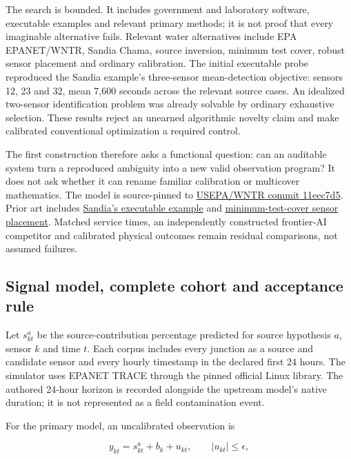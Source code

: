 \documentclass[
  11pt,
]{article}
\begin{document}
The search is bounded. It includes government and laboratory software,
executable examples and relevant primary methods; it is not proof that
every imaginable alternative fails. Relevant water alternatives include
EPA EPANET/WNTR, Sandia Chama, source inversion, minimum test cover,
robust sensor placement and ordinary calibration. The initial executable
probe reproduced the Sandia example's three-sensor mean-detection
objective: sensors 12, 23 and 32, mean 7,600 seconds across the relevant
source cases. An idealized two-sensor identification problem was already
solvable by ordinary exhaustive selection. These results reject an
unearned algorithmic novelty claim and make calibrated conventional
optimization a required control.

The first construction therefore asks a functional question: can an
auditable system turn a reproduced ambiguity into a new valid
observation program? It does not ask whether it can rename familiar
calibration or multicover mathematics. The model is source-pinned to
\href{https://github.com/USEPA/WNTR/tree/11eec7d5bf0a9367ffe04d75707918f0c0a890a1}{USEPA/WNTR
commit 11eec7d5}. Prior art includes
\href{https://github.com/sandialabs/chama/blob/main/examples/water_network_example.py}{Sandia's
executable example} and
\href{https://arxiv.org/abs/1507.07134}{minimum-test-cover sensor
placement}. Matched service times, an independently constructed
frontier-AI competitor and calibrated physical outcomes remain residual
comparisons, not assumed failures.

\hypertarget{signal-model-complete-cohort-and-acceptance-rule}{%
\subsection{Signal model, complete cohort and acceptance
rule}\label{signal-model-complete-cohort-and-acceptance-rule}}

Let \(s^a_{kt}\) be the source-contribution percentage predicted for
source hypothesis \(a\), sensor \(k\) and time \(t\). Each corpus
includes every junction as a source and candidate sensor and every
hourly timestamp in the declared first 24 hours. The simulator uses
EPANET TRACE through the pinned official Linux library. The authored
24-hour horizon is recorded alongside the upstream model's native
duration; it is not represented as a field contamination event.

For the primary model, an uncalibrated observation is

\[y_{kt}=s^a_{kt}+b_k+u_{kt},\qquad |u_{kt}|\leq\epsilon,\]
\end{document}
